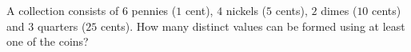 A collection consists of $6$ pennies ($1$ cent), $4$ nickels ($5$ cents), $2$ dimes ($10$ cents) and $3$ quarters ($25$ cents). How many distinct values can be formed using at least one of the coins?
